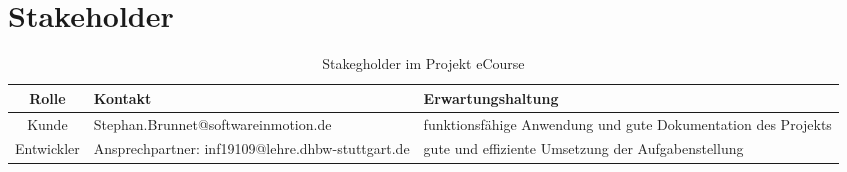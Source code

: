 \section{Stakeholder}

\begin{table}[H]
\centering
\begin{tabularx}{\textwidth}[H]{|c|X|X|}
\hline
Rolle &	Kontakt & Erwartungshaltung\\
\hline
Kunde & Stephan.Brunnet@softwareinmotion.de & funktionsfähige Anwendung und gute Dokumentation des Projekts \\
\hline
Entwickler & Ansprechpartner: inf19109@lehre.dhbw-stuttgart.de & gute und effiziente Umsetzung der Aufgabenstellung\\
\hline
\end{tabularx}
\caption{Stakegholder im Projekt eCourse}
\label{tab:Stakeholder}
\end{table}

